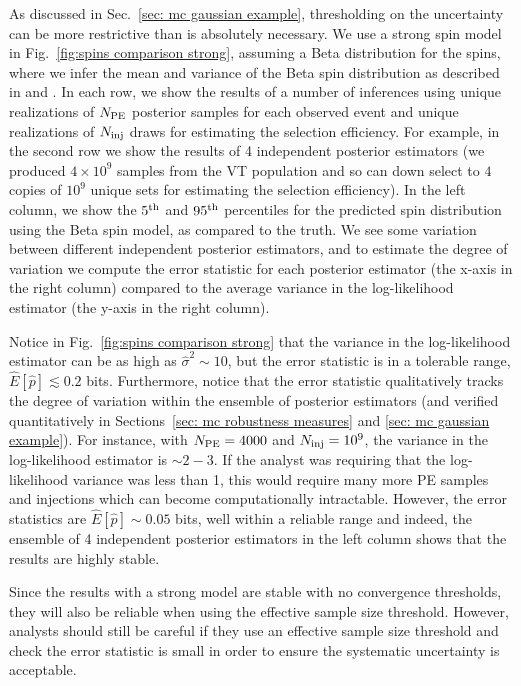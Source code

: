 As discussed in Sec.~\ref{sec: mc gaussian example}, thresholding on the uncertainty can be more restrictive than is absolutely necessary. We use a strong spin model in Fig.~\ref{fig:spins comparison strong}, assuming a Beta distribution for the spins, where we infer the mean and variance of the Beta spin distribution as described in \citet{Wysocki:2018mpo} and \citet{KAGRA:2021duu}. In each row, we show the results of a number of inferences using unique realizations of $N_{\rm PE}$ posterior samples for each observed event and unique realizations of $N_{\rm inj}$ draws for estimating the selection efficiency. For example, in the second row we show the results of 4 independent posterior estimators (we produced $4\times10^9$ samples from the VT population and so can down select to $4$ copies of $10^9$ unique sets for estimating the selection efficiency). In the left column, we show the $5^{\rm th}$ and $95^{\rm th}$ percentiles for the predicted spin distribution using the Beta spin model, as compared to the truth. We see some variation between different independent posterior estimators, and to estimate the degree of variation we compute the error statistic for each posterior estimator (the x-axis in the right column) compared to the average variance in the log-likelihood estimator (the y-axis in the right column). 


Notice in Fig.~\ref{fig:spins comparison strong} that the variance in the log-likelihood estimator can be as high as $\hat{\sigma}^2 \sim 10$, but the error statistic is in a tolerable range, $\hat{E}[\hat{p}] \lesssim 0.2$ bits. Furthermore, notice that the error statistic qualitatively tracks the degree of variation within the ensemble of posterior estimators (and verified quantitatively in Sections~\ref{sec: mc robustness measures} and \ref{sec: mc gaussian example}). For instance, with $N_{\rm PE} = 4000$ and $N_{\rm inj} = 10^9$, the variance in the log-likelihood estimator is $\sim 2-3$. If the analyst was requiring that the log-likelihood variance was less than 1, this would require many more \ac{PE} samples and injections which can become computationally intractable. However, the error statistics are $\hat{E}[\hat{p}] \sim 0.05$ bits, well within a reliable range and indeed, the ensemble of 4 independent posterior estimators in the left column shows that the results are highly stable. 

Since the results with a strong model are stable with no convergence thresholds, they will also be reliable when using the effective sample size threshold. However, analysts should still be careful if they use an effective sample size threshold and check the error statistic is small in order to ensure the systematic uncertainty is acceptable.

